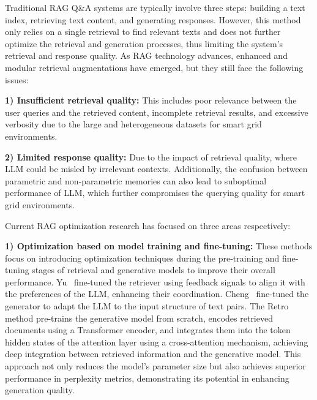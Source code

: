 Traditional RAG Q\&A systems are typically involve three steps: building a text index, retrieving text content, and generating responses. However, this method only relies on a single retrieval to find relevant texts and does not further optimize the retrieval and generation processes, thus limiting the system's retrieval and response quality. As RAG technology advances, enhanced and modular retrieval augmentations have emerged, but they still face the following issues:

\textbf{1) Insufficient retrieval quality:} This includes poor relevance between the user queries and the retrieved content, incomplete retrieval results, and excessive verbosity due to the large and heterogeneous datasets for smart grid environments.

\textbf{2) Limited response quality:} Due to the impact of retrieval quality, where LLM could be misled by irrelevant contexts. Additionally, the confusion between parametric and non-parametric memories can also lead to suboptimal performance of LLM, which further compromises the querying quality for smart grid environments.

Current RAG optimization research
has focused on three areas respectively:
%

\textbf{1) Optimization based on model training and fine-tuning:} These methods focus on introducing optimization techniques during the pre-training and fine-tuning stages of retrieval and generative models to improve their overall performance.  Yu~\cite{yu2023augmentation} fine-tuned the retriever using feedback signals to align it with the preferences of the LLM, enhancing their coordination. Cheng~\cite{cheng2024lift} fine-tuned the generator to adapt the LLM to the input structure of text pairs. The Retro~\cite{borgeaud2022improving} method pre-trains the generative model from scratch, encodes retrieved documents using a Transformer encoder, and integrates them into the token hidden states of the attention layer using a cross-attention mechanism, achieving deep integration between retrieved information and the generative model. This approach not only reduces the model's parameter size but also achieves superior performance in perplexity metrics, demonstrating its potential in enhancing generation quality.

